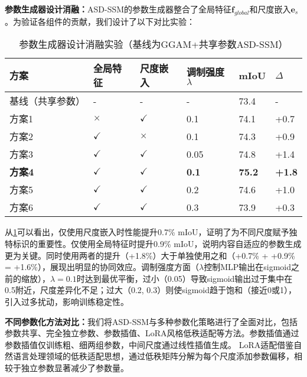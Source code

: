 \documentclass[preprint,12pt]{elsarticle}
\begin{document}
\textbf{参数生成器设计消融：}ASD-SSM的参数生成器整合了全局特征$\mathbf{f}_{global}$和尺度嵌入$\mathbf{e}_s$。为验证各组件的贡献，我们设计了以下对比实验：

\begin{table}[htbp!]
	\centering
	\caption{参数生成器设计消融实验（基线为GGAM+共享参数ASD-SSM）}
	\label{tab:paramgen_design}
	\begin{tabular}{@{}llllll@{}}
		\toprule
		方案 & 全局特征 & 尺度嵌入 & 调制强度$\lambda$ & mIoU & $\Delta$ \\ 
		\midrule
		基线（共享参数） & - & - & - & 73.4 & - \\
		\midrule
		方案1 & $\times$ & $\checkmark$ & 0.1 & 74.1 & +0.7 \\
		方案2 & $\checkmark$ & $\times$ & 0.1 & 74.3 & +0.9 \\
		方案3 & $\checkmark$ & $\checkmark$ & 0.05 & 74.8 & +1.4 \\
		\textbf{方案4} & $\checkmark$ & $\checkmark$ & \textbf{0.1} & \textbf{75.2} & \textbf{+1.8} \\
		方案5 & $\checkmark$ & $\checkmark$ & 0.2 & 74.6 & +1.0 \\
		方案6 & $\checkmark$ & $\checkmark$ & 0.3 & 73.9 & +0.3 \\
		\bottomrule
	\end{tabular}
\end{table}

从\cref{tab:paramgen_design}可以看出，仅使用尺度嵌入时性能提升0.7\% mIoU，证明了为不同尺度赋予独特标识的重要性。仅使用全局特征时提升0.9\% mIoU，说明内容自适应的参数生成更为关键。同时使用两者的提升（+1.8\%）大于单独使用之和（+0.7\% + +0.9\% = +1.6\%），展现出明显的协同效应。调制强度方面（$\lambda$控制MLP输出在sigmoid之前的缩放），$\lambda=0.1$时达到最优平衡，过小（0.05）导致sigmoid输出过于集中在0.5附近，尺度差异化不足；过大（0.2, 0.3）则使sigmoid趋于饱和（接近0或1），引入过多扰动，影响训练稳定性。

\textbf{不同参数化方法对比：}我们将ASD-SSM与多种参数化策略进行了全面对比，包括参数共享、完全独立参数、参数插值、LoRA风格低秩适配等方法。参数插值通过参数插值仅训练粗、细两组参数，中间尺度通过线性插值生成。
LoRA适配借鉴自然语言处理领域的低秩适配思想\cite{lora}，通过低秩矩阵分解为每个尺度添加参数偏移，相较于独立参数显著减少了参数量。
\end{document}
